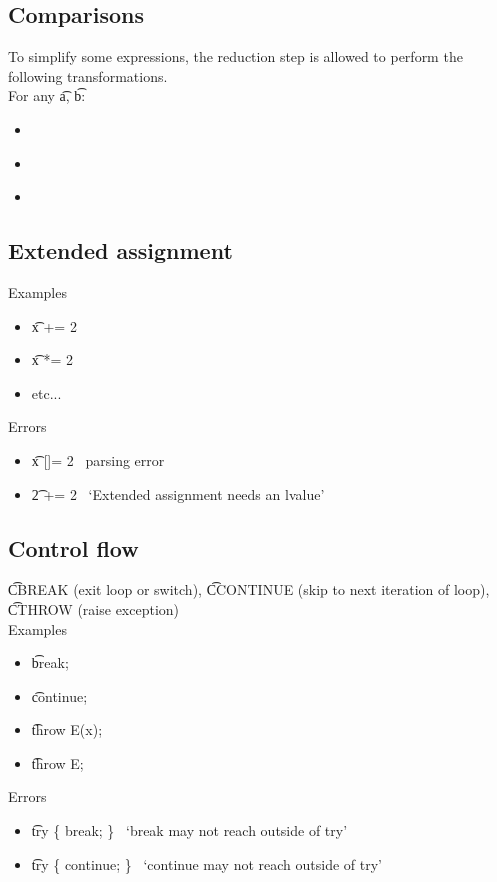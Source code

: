 \subsection{Comparisons}
To simplify some expressions, the reduction step is allowed to perform the following transformations.\\
For any \t{a}, \t{b}:
\begin{itemize}
    \item {} \to\ 
    \item {} \to\ 
    \item {} \to\ 
\end{itemize}

\subsection{Extended assignment}
Examples
\begin{itemize}
    \item \t{x += 2} \to\ 
    \item \t{x *= 2} \to\ 
    \item etc...
\end{itemize}
Errors
\begin{itemize}
    \item \t{x []= 2} \to\ parsing error
    \item \t{2 += 2} \to\ `Extended assignment needs an lvalue'
\end{itemize}

\subsection{Control flow}
\t{CBREAK} (exit loop or switch), \t{CCONTINUE} (skip to next iteration of loop), \t{CTHROW} (raise exception)\\
Examples
\begin{itemize}
    \item \t{break;} \to\ 
    \item \t{continue;} \to\ 
    \item \t{throw E(x);} \to\ 
    \item \t{throw E;} \to\ 
\end{itemize}
Errors
\begin{itemize}
    \item \t{try \{ break; \}} \to\ `break may not reach outside of try'
    \item \t{try \{ continue; \}} \to\ `continue may not reach outside of try'
\end{itemize}

